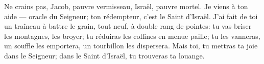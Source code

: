 Ne crains pas, Jacob, pauvre vermisseau, Israël, pauvre mortel.
Je viens à ton aide --- oracle du Seigneur;
	ton rédempteur, c’est le Saint d’Israël.
J’ai fait de toi un traîneau à battre le grain, tout neuf, à double rang de pointes:
	tu vas briser les montagnes, les broyer; tu réduiras les collines en menue paille;
	tu les vanneras, un souffle les emportera, un tourbillon les dispersera.
Mais toi, tu mettras ta joie dans le Seigneur;
	dans le Saint d’Israël, tu trouveras ta louange.
